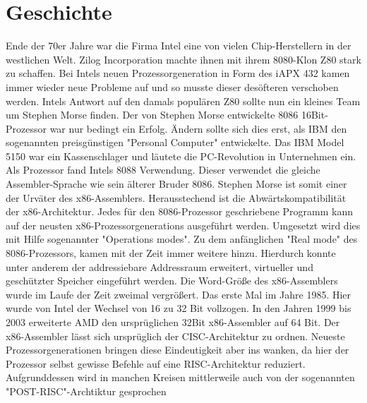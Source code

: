 \section{Geschichte}

Ende der 70er Jahre war die Firma Intel eine von vielen Chip-Herstellern in der westlichen Welt. Zilog Incorporation machte ihnen mit ihrem 8080-Klon Z80 stark zu schaffen. Bei Intels  neuen Prozessorgeneration in Form des iAPX 432 kamen immer wieder neue Probleme auf und so musste dieser desöfteren verschoben werden. Intels Antwort auf den damals populären Z80 sollte nun ein kleines Team um Stephen Morse finden.
Der von Stephen Morse entwickelte 8086 16Bit-Prozessor war nur bedingt ein Erfolg. Ändern sollte sich dies erst, als IBM den sogenannten preisgünstigen "Personal Computer" entwickelte. Das IBM Model 5150 war ein Kassenschlager und läutete die PC-Revolution in Unternehmen ein. Als Prozessor fand Intels 8088 Verwendung. Dieser verwendet die gleiche Assembler-Sprache wie sein älterer Bruder 8086. Stephen Morse ist somit einer der Urväter des x86-Assemblers.
Herausstechend ist die Abwärtskompatibilität der x86-Architektur. Jedes für den 8086-Prozessor geschriebene Programm kann auf der neusten x86-Prozessorgenerations ausgeführt werden. Umgesetzt wird dies mit Hilfe sogenannter "Operations modes". Zu dem anfänglichen "Real mode" des 8086-Prozessors, kamen mit der Zeit immer weitere hinzu. Hierdurch konnte unter anderem der addressiebare Addressraum erweitert, virtueller und geschützter Speicher eingeführt werden.
Die Word-Größe des x86-Assemblers wurde im Laufe der Zeit zweimal vergrößert. Das erste Mal im Jahre 1985. Hier wurde von Intel der Wechsel von 16 zu 32 Bit vollzogen. In den Jahren 1999 bis 2003 erweiterte AMD den ursprüglichen 32Bit x86-Assembler auf 64 Bit.
Der x86-Assembler lässt sich ursprüglich der CISC-Architektur zu ordnen. Neueste Prozessorgenerationen bringen diese Eindeutigkeit aber ins wanken, da hier der Prozessor selbst gewisse Befehle auf eine RISC-Architektur reduziert. Aufgrunddessen wird in manchen Kreisen mittlerweile auch von der sogenannten "POST-RISC"-Archtiktur gesprochen
